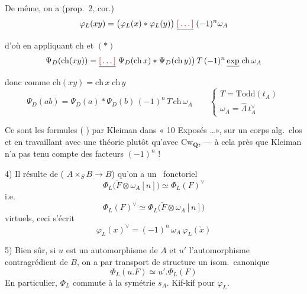 \documentclass[11pt,a4paper]{article}
\begin{document}


De même, on a (prop.\ 2, cor.)
\[
  \varphi_L(xy) = \bigl(\varphi_L(x) * \varphi_L(y)\bigr)\; \struck{\ill{}}\; (-1)^n \omega_A
\]
d'où en appliquant $\mathrm{ch}$ et $(*)$
\[
  \Psi_D(\mathrm{ch}(xy)) = \struck{\ill{}}\; \Psi_D(\mathrm{ch}\, x) * \Psi_D(\mathrm{ch}\, y)\bigr)\, T\, (-1)^n\, \struck{\exp}\; \mathrm{ch}\, \omega_A
\]
donc comme $\mathrm{ch}(xy) = \mathrm{ch}\, x\; \mathrm{ch}\, y$
\[
  \Psi_D(ab) = \Psi_D(a) * \Psi_D(b)\, (-1)^n\, T\, \mathrm{ch}\, \omega_A
  \qquad
  \begin{cases}
    T = \mathrm{Todd}(t_A) \\
    \omega_A = \hat\Lambda\, t_A^{\vee}
  \end{cases}
\]



Ce sont les formules (\struck{\ill{}} \ill{} ) par
Kleiman dans « 10 Exposés \ldots », sur un corps alg.\ clos et en travaillant
avec une théorie  plutôt qu'avec
$\mathrm{Cw}_{\mathbf{Q}}$, --- à cela près que Kleiman n'a pas tenu compte
des facteurs $(-1)^n$ !

4) Il résulte de ( $A \times_S B \to B$) qu'on
a un \ fonctoriel
\[
  \Phi_L\bigl(\check F \otimes \omega_A[n]\bigr) \simeq \Phi_L(F)^{\vee}
\]
i.e.
\[
  \Phi_L(F)^{\vee} \simeq \Phi_L\bigl(\check F \otimes \omega_A[n]\bigr)
\]
 \ill{} virtuels, ceci s'écrit
\[
  \varphi_L(x)^{\vee} = (-1)^n\, \omega_A\, \varphi_L(\check x)
\]


5) Bien sûr, si $u$ est un automorphisme de $A$ et $u'$ l'automorphisme
contragrédient de $B$, on a par transport de structure un isom.\ canonique
\[
  \Phi_L(u.F) \simeq u'.\Phi_L(F)
\]
En particulier, $\Phi_L$ commute à la symétrie $s_A$. Kif-kif pour $\varphi_L$.
\end{document}
